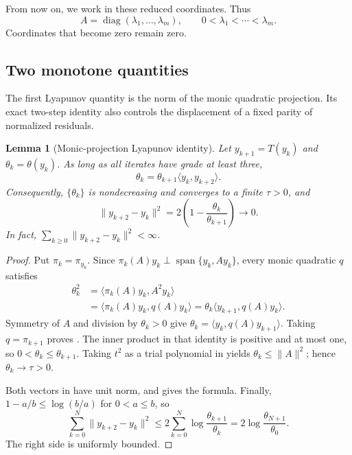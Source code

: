 \documentclass[11pt]{article}
\newtheorem{lemma}{Lemma}[section]
\begin{document}
From now on, we work in these reduced coordinates.  Thus
\[
 A=\operatorname{diag}(\lambda_1,\ldots,\lambda_m),
 \qquad 0<\lambda_1<\cdots<\lambda_m.
\]
Coordinates that become zero remain zero.

\subsection{Two monotone quantities}

The first Lyapunov quantity is the norm of the monic quadratic projection.
Its exact two-step identity also controls the displacement of a fixed
parity of normalized residuals.

\begin{lemma}[Monic-projection Lyapunov identity]
\label{lem:monic-monotonicity}
Let \(y_{k+1}=T(y_k)\) and \(\theta_k=\theta(y_k)\).  As long as all
iterates have grade at least three,
\[
 \theta_k=\theta_{k+1}\langle y_k,y_{k+2}\rangle.
\tag{3}\label{eq:theta-identity}
\]
Consequently, \(\{\theta_k\}\) is nondecreasing and converges to a finite
\(\tau>0\), and
\[
 \lVert y_{k+2}-y_k\rVert^2
 =2\left(1-\frac{\theta_k}{\theta_{k+1}}\right)\longrightarrow0.
\tag{4}\label{eq:two-step-displacement}
\]
In fact,
\(\sum_{k\geq0}\lVert y_{k+2}-y_k\rVert^2<\infty\).
\end{lemma}

\begin{proof}
Put \(\pi_k=\pi_{y_k}\).  Since
\(\pi_k(A)y_k\perp\operatorname{span}\{y_k,Ay_k\}\), every monic
quadratic \(q\) satisfies
\[
 \begin{aligned}
 \theta_k^2
 &=\langle\pi_k(A)y_k,A^2y_k\rangle\\
 &=\langle\pi_k(A)y_k,q(A)y_k\rangle
 =\theta_k\langle y_{k+1},q(A)y_k\rangle.
 \end{aligned}
\]
Symmetry of \(A\) and division by \(\theta_k>0\) give
\(\theta_k=\langle y_k,q(A)y_{k+1}\rangle\).  Taking
\(q=\pi_{k+1}\) proves .
The inner product in that identity is positive and at most one, so
\(0<\theta_k\leq\theta_{k+1}\).  Taking \(t^2\) as a trial polynomial in
 yields \(\theta_k\leq\lVert A\rVert^2\);
hence \(\theta_k\to\tau>0\).

Both vectors in  have unit norm, and
 gives the formula.  Finally,
\(1-a/b\leq\log(b/a)\) for \(0<a\leq b\), so
\[
 \sum_{k=0}^N\lVert y_{k+2}-y_k\rVert^2
 \leq2\sum_{k=0}^N\log\frac{\theta_{k+1}}{\theta_k}
 =2\log\frac{\theta_{N+1}}{\theta_0}.
\]
The right side is uniformly bounded.
\end{proof}
\end{document}
